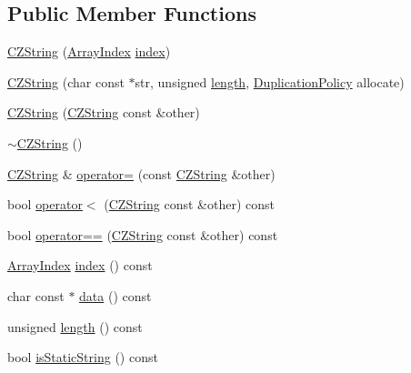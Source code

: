 \subsection*{Public Member Functions}
\begin{DoxyCompactItemize}
\item 
\hyperlink{classJson_1_1Value_1_1CZString_a4b8aa6eaabdec78cffec96e088da996f_a4b8aa6eaabdec78cffec96e088da996f}{C\+Z\+String} (\hyperlink{classJson_1_1Value_a184a91566cccca7b819240f0d5561c7d_a184a91566cccca7b819240f0d5561c7d}{Array\+Index} \hyperlink{classJson_1_1Value_1_1CZString_a0f3ba09401525d4f01dafd577122ee32_a0f3ba09401525d4f01dafd577122ee32}{index})
\item 
\hyperlink{classJson_1_1Value_1_1CZString_a86a86eaf0cf26d4c861d0daa359d608a_a86a86eaf0cf26d4c861d0daa359d608a}{C\+Z\+String} (char const $\ast$str, unsigned \hyperlink{classJson_1_1Value_1_1CZString_aa7ee665d162c1f33b3ec818e289d8a5e_aa7ee665d162c1f33b3ec818e289d8a5e}{length}, \hyperlink{classJson_1_1Value_1_1CZString_a2805c46fb4a72bbaed55de6d75941b6d_a2805c46fb4a72bbaed55de6d75941b6d}{Duplication\+Policy} allocate)
\item 
\hyperlink{classJson_1_1Value_1_1CZString_a9685070d440335b55ef5c85747d25157_a9685070d440335b55ef5c85747d25157}{C\+Z\+String} (\hyperlink{classJson_1_1Value_1_1CZString}{C\+Z\+String} const \&other)
\item 
\hyperlink{classJson_1_1Value_1_1CZString_add6989dc7073646b95e5ebacb3f07d51_add6989dc7073646b95e5ebacb3f07d51}{$\sim$\+C\+Z\+String} ()
\item 
\hyperlink{classJson_1_1Value_1_1CZString}{C\+Z\+String} \& \hyperlink{classJson_1_1Value_1_1CZString_aba1b28d22cdd1eaad1c17f8844af9d4a_aba1b28d22cdd1eaad1c17f8844af9d4a}{operator=} (const \hyperlink{classJson_1_1Value_1_1CZString}{C\+Z\+String} \&other)
\item 
bool \hyperlink{classJson_1_1Value_1_1CZString_ae023bb91b4b4520c82d5e6e4da8c310a_ae023bb91b4b4520c82d5e6e4da8c310a}{operator$<$} (\hyperlink{classJson_1_1Value_1_1CZString}{C\+Z\+String} const \&other) const
\item 
bool \hyperlink{classJson_1_1Value_1_1CZString_ad41766c98fc6a6d5fcd72aaf78fc5db0_ad41766c98fc6a6d5fcd72aaf78fc5db0}{operator==} (\hyperlink{classJson_1_1Value_1_1CZString}{C\+Z\+String} const \&other) const
\item 
\hyperlink{classJson_1_1Value_a184a91566cccca7b819240f0d5561c7d_a184a91566cccca7b819240f0d5561c7d}{Array\+Index} \hyperlink{classJson_1_1Value_1_1CZString_a0f3ba09401525d4f01dafd577122ee32_a0f3ba09401525d4f01dafd577122ee32}{index} () const
\item 
char const  $\ast$ \hyperlink{classJson_1_1Value_1_1CZString_af6eee54f8dc43a1203d5af6ba0a5c9a2_af6eee54f8dc43a1203d5af6ba0a5c9a2}{data} () const
\item 
unsigned \hyperlink{classJson_1_1Value_1_1CZString_aa7ee665d162c1f33b3ec818e289d8a5e_aa7ee665d162c1f33b3ec818e289d8a5e}{length} () const
\item 
bool \hyperlink{classJson_1_1Value_1_1CZString_a5991dfa2f6c2ba318373c7429fcd7a57_a5991dfa2f6c2ba318373c7429fcd7a57}{is\+Static\+String} () const
\end{DoxyCompactItemize}
